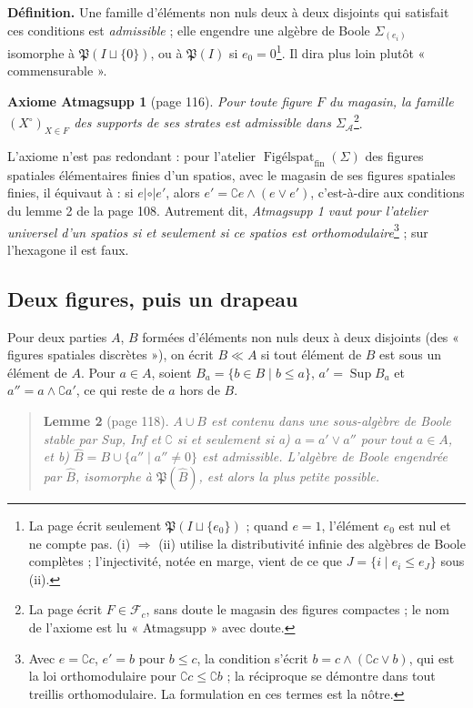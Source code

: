 \documentclass[11pt,a4paper]{article}
\begin{document}
\textbf{Définition.} Une famille d'éléments non nuls deux à deux disjoints qui
satisfait ces conditions est \emph{admissible} ; elle engendre une algèbre de
Boole $\Sigma_{(e_{i})}$ isomorphe à $\mathfrak{P}(I \sqcup \{0\})$, ou à
$\mathfrak{P}(I)$ si $e_{0} = 0$\footnote{La page écrit seulement
$\mathfrak{P}(I \sqcup \{e_{0}\})$ ; quand $e = 1$, l'élément $e_{0}$ est nul et
ne compte pas. (i) $\Rightarrow$ (ii) utilise la distributivité infinie des
algèbres de Boole complètes ; l'injectivité, notée en marge, vient de ce que $J =
\{i \mid e_{i} \leq e_{J}\}$ sous (ii).}. Il dira plus loin plutôt
« commensurable ».

\textbf{Axiome Atmagsupp 1} (page 116). \emph{Pour toute figure $F$ du magasin,
la famille $(X^{\circ})_{X \in F}$ des supports de ses strates est admissible dans
$\Sigma_{\mathcal{A}}$}\footnote{La page écrit $F \in \mathcal{F}_{c}$, sans doute
le magasin des figures compactes ; le nom de l'axiome est lu « Atmagsupp » avec
doute.}.

L'axiome n'est pas redondant : pour l'atelier
$\operatorname{\text{Figélspat}}_{\mathrm{fin}}(\Sigma)$ des figures spatiales
élémentaires finies d'un spatios, avec le magasin de ses figures spatiales finies,
il équivaut à : si $e \mathrel{|\circ|} e'$, alors $e' = \complement e \wedge (e
\vee e')$, c'est-à-dire aux conditions du lemme 2 de la page 108. Autrement
dit, \emph{Atmagsupp 1 vaut pour l'atelier universel d'un spatios si et seulement
si ce spatios est orthomodulaire}\footnote{Avec $e = \complement c$, $e' = b$ pour
$b \leq c$, la condition s'écrit $b = c \wedge (\complement c \vee b)$, qui est la
loi orthomodulaire pour $\complement c \leq \complement b$ ; la réciproque se
démontre dans tout treillis orthomodulaire. La formulation en ces termes est la
nôtre.} ; sur l'hexagone il est faux.

\subsection*{Deux figures, puis un drapeau}

Pour deux parties $A$, $B$ formées d'éléments non nuls deux à deux disjoints
(des « figures spatiales discrètes »), on écrit $B \ll A$ si tout élément de $B$
est sous un élément de $A$. Pour $a \in A$, soient $B_{a} = \{b \in B \mid b \leq
a\}$, $a' = \operatorname{Sup}B_{a}$ et $a'' = a \wedge \complement a'$, ce qui
reste de $a$ hors de $B$.

\begin{quote}
\textbf{Lemme 2} (page 118). \emph{$A \cup B$ est contenu dans une sous-algèbre de
Boole stable par Sup, Inf et $\complement$ si et seulement si a) $a = a' \vee
a''$ pour tout $a \in A$, et b) $\widehat{B} = B \cup \{a'' \mid a'' \neq 0\}$ est
admissible. L'algèbre de Boole engendrée par $\widehat{B}$, isomorphe à
$\mathfrak{P}(\widehat{B})$, est alors la plus petite possible.}
\end{quote}
\end{document}
